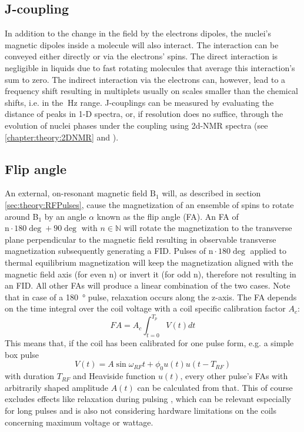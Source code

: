         \subsection{J-coupling}
        In addition to the change in the field by the electrons dipoles, the nuclei's magnetic dipoles inside a molecule will also interact. The interaction can be conveyed either directly or via the electrons' spins. The direct interaction is negligible in liquids due to fast rotating molecules that average this interaction's sum to zero. The indirect interaction via the electrons can, however, lead to a frequency shift resulting in multiplets usually on scales smaller than the chemical shifts, i.e. in the $\SI{}{\hertz}$ range.
        J-couplings can be measured by evaluating the distance of peaks in 1-D spectra, or, if resolution does no suffice, through the evolution of nuclei phases under the coupling using 2d-NMR spectra (see \ref{chapter:theory:2DNMR} and \cite{ottiger_measurement_1998}).
        \subsection{Flip angle}
        An external, on-resonant magnetic field $\mathrm{B}_1$ will, as described in section \ref{sec:theory:RFPulses}, cause the magnetization of an ensemble of spins to rotate around B$_1$ by an angle $\alpha$ known as the flip angle (FA). An FA of $\mathrm n\cdot 180 \deg + 90 \deg$ with $n \in \mathbb{N}$ will rotate the magnetization to the transverse plane perpendicular to the magnetic field resulting in observable transverse magnetization subsequently generating a FID. Pulses of $\mathrm n\cdot 180 \deg$ applied to thermal equilibrium magnetization will keep the magnetization aligned with the magnetic field axis (for even n) or invert it (for odd n), therefore not resulting in an FID. All other FAs will produce a linear combination of the two cases. Note that in case of a \SI{180}{\degree} pulse, relaxation occurs along the z-axis. The FA depends on the time integral over the coil voltage with a coil specific calibration factor $A_c$:
            \begin{equation}
                \label{eq:theory:FA}
                FA = A_c \int_{t=0}^{T_p}{V(t)dt}
            \end{equation}
            This means that, if the coil has been calibrated for one pulse form, e.g. a simple box pulse 
            \begin{equation}
                V(t) = A\sin{\omega_{RF} t + \phi_0} u(t)u(t-T_{RF})
            \end{equation}
            with duration $T_{RF}$ and Heaviside function $u(t)$, every other pulse's FAs with arbitrarily shaped amplitude $A(t)$ can be calculated from that. This of course excludes effects like relaxation during pulsing \cite{wang_factors_2006}, which can be relevant especially for long pulses and is also not considering hardware limitations on the coils concerning maximum voltage or wattage.
